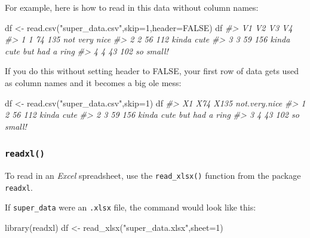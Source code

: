 \documentclass[
]{book}
\newenvironment{Shaded}{\begin{snugshade}}{\end{snugshade}}
\newcommand{\AttributeTok}[1]{\textcolor[rgb]{0.77,0.63,0.00}{#1}}
\newcommand{\CommentTok}[1]{\textcolor[rgb]{0.56,0.35,0.01}{\textit{#1}}}
\newcommand{\ConstantTok}[1]{\textcolor[rgb]{0.00,0.00,0.00}{#1}}
\newcommand{\DecValTok}[1]{\textcolor[rgb]{0.00,0.00,0.81}{#1}}
\newcommand{\FunctionTok}[1]{\textcolor[rgb]{0.00,0.00,0.00}{#1}}
\newcommand{\NormalTok}[1]{#1}
\newcommand{\OtherTok}[1]{\textcolor[rgb]{0.56,0.35,0.01}{#1}}
\newcommand{\StringTok}[1]{\textcolor[rgb]{0.31,0.60,0.02}{#1}}
\begin{document}
For example, here is how to read in this data without column names:

\begin{Shaded}
\begin{Highlighting}[]
\NormalTok{df }\OtherTok{\textless{}{-}} \FunctionTok{read.csv}\NormalTok{(}\StringTok{"super\_data.csv"}\NormalTok{,}\AttributeTok{skip=}\DecValTok{1}\NormalTok{,}\AttributeTok{header=}\ConstantTok{FALSE}\NormalTok{)}
\NormalTok{df}
\CommentTok{\#\textgreater{}   V1 V2  V3                        V4}
\CommentTok{\#\textgreater{} 1  1 74 135             not very nice}
\CommentTok{\#\textgreater{} 2  2 56 112                kinda cute}
\CommentTok{\#\textgreater{} 3  3 59 156 kinda cute but had a ring}
\CommentTok{\#\textgreater{} 4  4 43 102                 so small!}
\end{Highlighting}
\end{Shaded}

If you do this without setting header to FALSE, your first row of data gets used as column names and it becomes a big ole mess:

\begin{Shaded}
\begin{Highlighting}[]
\NormalTok{df }\OtherTok{\textless{}{-}} \FunctionTok{read.csv}\NormalTok{(}\StringTok{"super\_data.csv"}\NormalTok{,}\AttributeTok{skip=}\DecValTok{1}\NormalTok{)}
\NormalTok{df}
\CommentTok{\#\textgreater{}   X1 X74 X135             not.very.nice}
\CommentTok{\#\textgreater{} 1  2  56  112                kinda cute}
\CommentTok{\#\textgreater{} 2  3  59  156 kinda cute but had a ring}
\CommentTok{\#\textgreater{} 3  4  43  102                 so small!}
\end{Highlighting}
\end{Shaded}

\hypertarget{readxl}{%
\subsubsection*{\texorpdfstring{\texttt{readxl()}}{readxl()}}\label{readxl}}

To read in an \emph{Excel} spreadsheet, use the \texttt{read\_xlsx()} function from the package \texttt{readxl}.

If \texttt{super\_data} were an \texttt{.xlsx} file, the command would look like this:

\begin{Shaded}
\begin{Highlighting}[]
\FunctionTok{library}\NormalTok{(readxl)}
\NormalTok{df }\OtherTok{\textless{}{-}} \FunctionTok{read\_xlsx}\NormalTok{(}\StringTok{"super\_data.xlsx"}\NormalTok{,}\AttributeTok{sheet=}\DecValTok{1}\NormalTok{)}
\end{Highlighting}
\end{Shaded}
\end{document}

